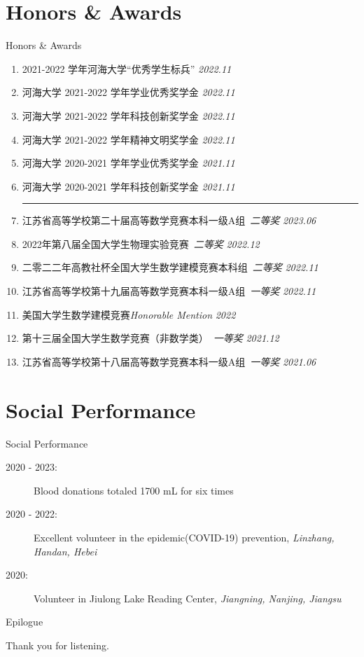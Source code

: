 \documentclass[9pt,aspectratio=169,hyperref=colorlinks]{beamer}
\begin{document}
\section{Honors \& Awards}
\begin{frame}{Honors \& Awards}
    \begin{enumerate}
        \item 2021-2022 学年河海大学“优秀学生标兵” \hfill \textit{2022.11}
        \item 河海大学 2021-2022 学年学业优秀奖学金 \hfill \textit{2022.11}
        \item 河海大学 2021-2022 学年科技创新奖学金 \hfill \textit{2022.11}
        \item 河海大学 2021-2022 学年精神文明奖学金 \hfill \textit{2022.11}
        \item 河海大学 2020-2021 学年学业优秀奖学金 \hfill \textit{2021.11}
        \item 河海大学 2020-2021 学年科技创新奖学金 \hfill \textit{2021.11}

              \medskip \hrule \medskip

        \item 江苏省高等学校第二十届高等数学竞赛本科一级A组\ \textit{二等奖} \hfill \textit{2023.06}
        \item 2022年第八届全国大学生物理实验竞赛\ \textit{二等奖}  \hfill \textit{2022.12}
        \item 二零二二年高教社杯全国大学生数学建模竞赛本科组\ \textit{二等奖} \hfill \textit{2022.11}
        \item 江苏省高等学校第十九届高等数学竞赛本科一级A组\ \textit{一等奖} \hfill \textit{2022.11}
        \item 美国大学生数学建模竞赛\textit{Honorable Mention} \hfill \textit{2022}
        \item 第十三届全国大学生数学竞赛（非数学类）\ \textit{一等奖} \hfill \textit{2021.12}
        \item 江苏省高等学校第十八届高等数学竞赛本科一级A组\ \textit{一等奖} \hfill \textit{2021.06}
    \end{enumerate}
\end{frame}

\section{Social Performance}
\begin{frame}{Social Performance}
    \begin{description}
        \item[2020 - 2023:] Blood donations totaled 1700 mL for six times
        \item[2020 - 2022:] Excellent volunteer in the epidemic(COVID-19) prevention, \textit{Linzhang, Handan, Hebei}
        \item[2020:] Volunteer in Jiulong Lake Reading Center, \textit{Jiangning, Nanjing, Jiangsu}
    \end{description}
\end{frame}

\begin{frame}{Epilogue}

    {\Huge \calligra Thank you for listening.}

\end{frame}
\end{document}
